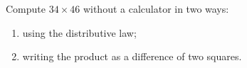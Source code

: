 Compute $34\times46$ without a calculator in two ways:
\begin{enumerate}
\item[(a)] using the distributive law;
\item[(b)] writing the product as a difference of two squares.
\end{enumerate}
